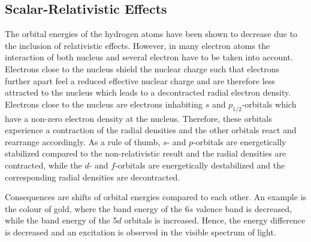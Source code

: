 \subsection{Scalar-Relativistic Effects}
The orbital energies of the hydrogen atoms have been shown to decrease
due to the inclusion of relativistic effects. However, in many electron
atoms the interaction of both nucleus and several electron have to be taken
into account. Electrons close to the nucleus shield the nuclear charge such
that electrons further apart feel a reduced effective nuclear charge and
are therefore less attracted to the nucleus which leads to a decontracted
radial electron density.
Electrons close to the nucleus are electrons inhabiting $s$ and
$p_{1/2}$-orbitals which
have a non-zero electron density at the nucleus. Therefore, these orbitals
experience a contraction of the radial densities and the other orbitals
react and rearrange accordingly. As a rule of thumb, $s$- and $p$-orbitals
are energetically stabilized compared to the non-relativistic result
and the radial densities are contracted, while
the $d$- and $f$-orbitals are energetically destabilized
and the corresponding radial densities are decontracted.

Consequences are shifts of orbital energies compared to each other. An example
is the colour of gold, where the band energy of the 6$s$ valence band is
decreased, while the band energy of the 5$d$ orbitals is increased. Hence,
the energy difference is decreased and an excitation is observed in the
visible spectrum of light.
